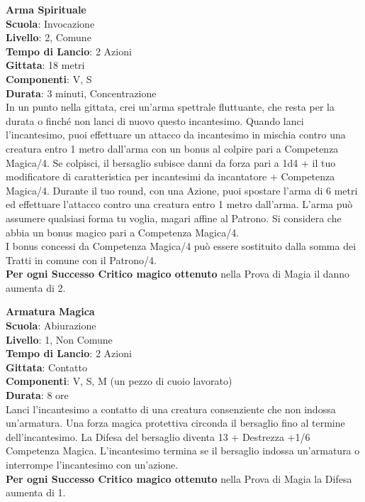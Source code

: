 \begin{multicols}{2}
\medskip\textbf{Arma Spirituale}\\
\textbf{Scuola}: Invocazione\\
\textbf{Livello}: 2, Comune\\
\textbf{Tempo di Lancio}: 2 Azioni\\
\textbf{Gittata}: 18 metri\\
\textbf{Componenti}: V, S\\
\textbf{Durata}: 3 minuti, Concentrazione\\
In un punto nella gittata, crei un'arma spettrale fluttuante, che resta per la durata o finché non lanci di nuovo questo incantesimo. Quando lanci l'incantesimo, puoi effettuare un attacco da incantesimo in mischia contro una creatura entro 1 metro dall'arma con un bonus al colpire pari a Competenza Magica/4. Se colpisci, il bersaglio subisce danni da forza pari a 1d4 + il tuo modificatore di caratteristica per incantesimi da incantatore + Competenza Magica/4. Durante il tuo round, con una Azione, puoi spostare l'arma di 6 metri ed effettuare l'attacco contro una creatura entro 1 metro dall'arma. L'arma può assumere qualsiasi forma tu voglia, magari affine al Patrono. Si considera che abbia un bonus magico pari a Competenza Magica/4. \\
I bonus concessi da Competenza Magica/4 può essere sostituito dalla somma dei Tratti in comune con il Patrono/4.\\
\textbf{Per ogni Successo Critico magico ottenuto} nella Prova di Magia il danno aumenta di 2.

\medskip\textbf{Armatura Magica}\\
\textbf{Scuola}: Abiurazione\\
\textbf{Livello}: 1, Non Comune\\
\textbf{Tempo di Lancio}: 2 Azioni\\
\textbf{Gittata}: Contatto\\
\textbf{Componenti}: V, S, M (un pezzo di cuoio lavorato)\\
\textbf{Durata}: 8 ore\\
Lanci l'incantesimo a contatto di una creatura consenziente che non indossa un'armatura. Una forza magica protettiva circonda il bersaglio fino al termine dell'incantesimo. La Difesa del bersaglio diventa 13 + Destrezza +1/6 Competenza Magica. L'incantesimo termina se il bersaglio indossa un'armatura o interrompe l'incantesimo con un'azione.\\
\textbf{Per ogni Successo Critico magico ottenuto} nella Prova di Magia la Difesa aumenta di 1.


\end{multicols}
